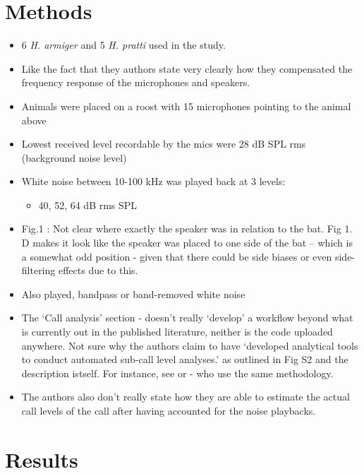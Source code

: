 \documentclass[
]{book}
\providecommand{\tightlist}{%
  \setlength{\itemsep}{0pt}\setlength{\parskip}{0pt}}
\begin{document}
\hypertarget{methods}{%
\section{Methods}\label{methods}}

\begin{itemize}
\tightlist
\item
  6 \emph{H. armiger} and 5 \emph{H. pratti} used in the study.
\item
  Like the fact that they authors state very clearly how they compensated the frequency response of the microphones and speakers.
\item
  Animals were placed on a roost with 15 microphones pointing to the animal above
\item
  Lowest received level recordable by the mics were 28 dB SPL rms (background noise level)
\item
  White noise between 10-100 kHz was played back at 3 levels:

  \begin{itemize}
  \tightlist
  \item
    40, 52, 64 dB rms SPL
  \end{itemize}
\item
  Fig.1 : Not clear where exactly the speaker was in relation to the bat. Fig 1. D makes it look like the speaker was placed to one side of the bat -- which is a somewhat odd position - given that there could be side biases or even side-filtering effects due to this.
\item
  Also played, bandpass or band-removed white noise
\item
  The `Call analysis' section - doesn't really `develop' a workflow beyond what is currently out in the published literature, neither is the code uploaded anywhere. Not sure why the authors claim to have `developed analytical tools to conduct automated sub-call level analyses.' as outlined in Fig S2 and the description istself. For instance, see \citep{siemers2005species} or \citep{schoeppler2018precise} - who use the same methodology.
\item
  The authors also don't really state how they are able to estimate the actual call levels of the call after having accounted for the noise playbacks.
\end{itemize}

\hypertarget{results}{%
\section{Results}\label{results}}
\end{document}
